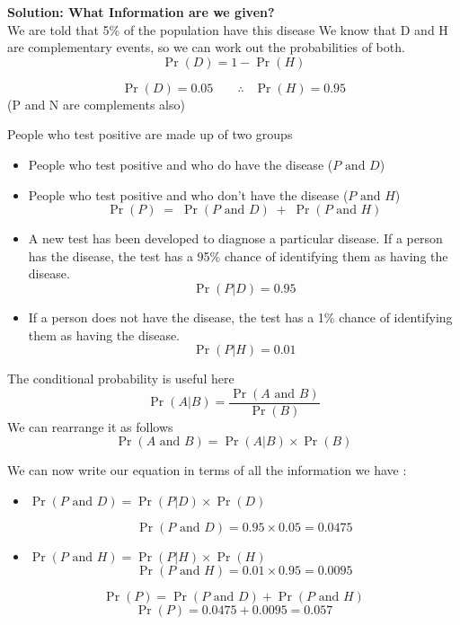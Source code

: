 	\noindent \textbf{Solution: What Information are we given?}\\
	
	\noindent We are told that 5\% of the population have this disease 
	We know that D and H are complementary events, so we can work out the probabilities of both. 
	\[\Pr(D) = 1-\Pr(H)\]
	
	
	\[  \Pr(D) = 0.05 \;\;\; \;\;\;\;  \therefore\;\;\ \Pr(H) = 0.95\]
	(P and N are complements also)\\ \smallskip
	
	
	\noindent People who test positive are made up of two groups
	\begin{itemize}
		\item People who test positive and who do have the disease  ($P \mbox{ and } D$)
		\item People who test positive and who don’t have the disease  ($P \mbox{ and } H$)
		\[\Pr(P) \; =  \;\Pr(P \mbox{ and } D) \; +  \;\Pr(P \mbox{ and } H)\]
		
	\end{itemize}
	\smallskip
	
	\begin{itemize}
		\item A new test has been developed to diagnose a particular disease. If a person has the disease, the test has a 95\% chance of identifying them as having the disease. 
		\[ \Pr(P|D) = 0.95\]
		
		\item If a person does not have the disease, the test has a 1\% chance of identifying them as having the disease. 
		\[ \Pr(P|H) = 0.01\]
	\end{itemize}	
	
	\begin{framed}
		\noindent The conditional probability is useful here		 
		{
			\large
			\[ \Pr(A | B) = \frac{\Pr(A \mbox{ and } B)}{\Pr(B)} \]
		}
		\noindent We can rearrange it as follows 		 
		{
			\large
			\[ \Pr(A \mbox{ and } B) =  \Pr(A|B) \times \Pr(B) \]
		}
	\end{framed}
	\medskip
	\noindent We can now write our equation in terms of all the information we have :
	
	\begin{itemize}
		\item $\Pr(P \mbox{ and } D) = \Pr(P|D) \times \Pr(D)$
		
		\[\Pr(P \mbox{ and } D) = 0.95 \times 0.05 = 0.0475\]
		
		\item $\Pr(P \mbox{ and } H) = \Pr(P|H) \times \Pr(H)$
		\[\Pr(P \mbox{ and } H) = 0.01 \times 0.95 = 0.0095\]
	\end{itemize}
	{
		\large
		\[\Pr(P)  =  \Pr(P \mbox{ and } D)  +  \Pr(P \mbox{ and } H)\]
		\[\Pr(P)  =  0.0475  +  0.0095 =  \boldsymbol{0.057}\]
	}
	\bigskip
	
